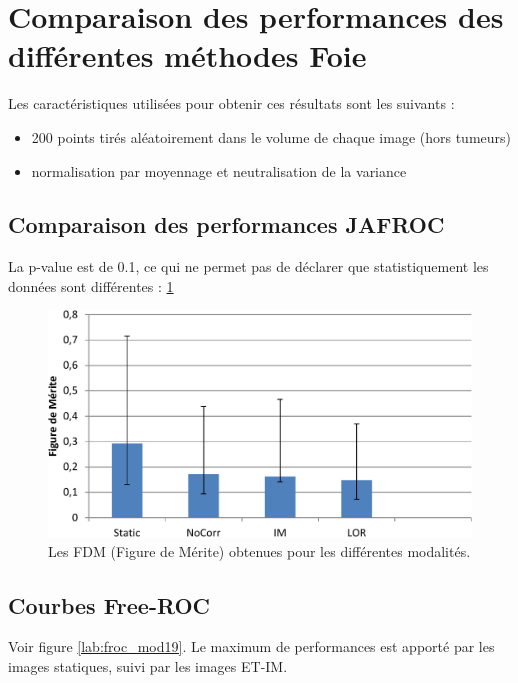 \FloatBarrier

\section{Comparaison des performances des différentes méthodes Foie}

Les caractéristiques utilisées pour obtenir ces résultats sont les suivants :

\begin{itemize}
 \item 200 points tirés aléatoirement dans le volume de chaque image (hors tumeurs)
 \item normalisation par moyennage et neutralisation de la variance 
\end{itemize}

\subsection{Comparaison des performances JAFROC}

La p-value est de 0.1, ce qui ne permet pas de déclarer que statistiquement les données sont différentes : \ref{lab:fom_mod19}


\begin{figure}[h!]
 \begin{center}
   \includegraphics[width=15cm]{images/FOM_mod19}
 \end{center}
 \caption{ \label{lab:fom_mod19} Les FDM (Figure de Mérite) obtenues pour les différentes modalités.}
\end{figure}


\subsection{Courbes Free-ROC}

Voir figure \ref{lab:froc_mod19}.
Le maximum de performances est apporté par les images statiques, suivi par les images ET-IM.

